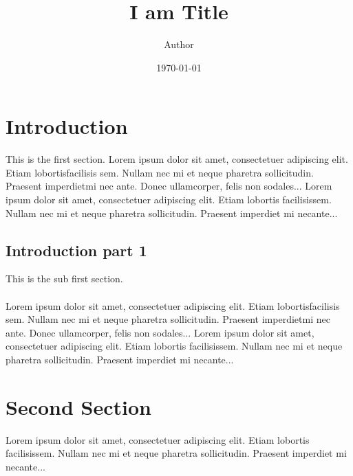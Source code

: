 \documentclass{article}
\title{I am Title}
\author{Author}
\date{\today}
\begin{document}
\maketitle
\tableofcontents
\newpage
\section{Introduction}
{
This is the first section.
Lorem  ipsum  dolor  sit  amet,  consectetuer  adipiscing elit. Etiam  lobortisfacilisis sem.  Nullam nec mi et neque pharetra sollicitudin.  Praesent imperdietmi nec ante. Donec ullamcorper, felis non sodales... Lorem ipsum dolor sit amet, consectetuer adipiscing elit. Etiam lobortis facilisissem.  Nullam nec mi et neque pharetra sollicitudin.  Praesent imperdiet mi necante...
}
\subsection{Introduction part 1 }
{
This is the sub first section. \\\\ Lorem  ipsum  dolor  sit  amet,  consectetuer  adipiscing elit. Etiam  lobortisfacilisis sem.  Nullam nec mi et neque pharetra sollicitudin.  Praesent imperdietmi nec ante. Donec ullamcorper, felis non sodales... Lorem ipsum dolor sit amet, consectetuer adipiscing elit. Etiam lobortis facilisissem.  Nullam nec mi et neque pharetra sollicitudin.  Praesent imperdiet mi necante...
}
\section{Second Section}
{
Lorem ipsum dolor sit amet, consectetuer adipiscing elit. Etiam lobortis facilisissem.  Nullam nec mi et neque pharetra sollicitudin.  Praesent imperdiet mi necante...
}
\end{document}
